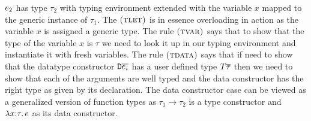 \documentclass[format=sigplan,manuscript,review,screen,nonacm,margin=1in]{acmart}
\begin{document}
$e_2$ has type $\tau_2$ with typing environment extended with the variable $x$ mapped
to the generic instance of $\tau_1$. The $\textsc{(tlet)}$ is in essence overloading in action
as the variable $x$ is assigned a generic type. The rule $\textsc{(tvar)}$ says that to show
that the type of the variable $x$ is $\tau$ we need to look it up in our typing environment
and instantiate it with fresh variables. The rule $\textsc{(tdata)}$ says that if need to show
that the datatype constructor $\texttt{D}\overline{e_i}$ has a user defined type $T\overline{\tau}$
then we need to show that each of the arguments are well typed
and the data constructor has the right type as given by its declaration.
The data constructor case can be viewed as a generalized version of function types as $\tau_1\to\tau_2$ is
a type constructor and $\lambda x{:}\tau.\, e$ as its data constructor.

\newcommand\TAbs{
  \ib{\irule[\trule{t-abs}]
    {\QTyping \Preds {\TEnv, x\co\tau_1} {\Tm} {\tau}};
    {\QTyping \Preds \TEnv {\Lam x {\tau_1} \Tm} {\tau_1 \to \tau}}}
}
 
\newcommand\TApp{
  \ib{\irule[\trule{t-app}]
    {\QTyping \Preds \TEnv {\Tm_1} {\tau_2 \to \tau}}
    {\QTyping \Preds \TEnv {\Tm_2} {\tau_2}};
    {\QTyping \Preds \TEnv {\Tm_1\App\Tm_2} {\tau}}}
}

\newcommand\TLet{\ib{\irule[\trule{t-let}]
  {\QTyping \Preds {\TEnv} {\Tm_1} \tau_1}
  {\sigma = \Gen \TEnv {\Preds\then\tau_1}}
  {\QTyping {\Preds_1} {\TEnv, x\co\sigma} {\Tm_2} \tau_2};
  {\QTyping {\Preds_1} \TEnv {\Let x {\Tm_1} {\Tm_2}} \tau_2}}
}

\newcommand\TVar{
  \ib{\irule[\trule{t-var}]
    {x\co\sigma \in \TEnv}
    {P\then\tau = \Ins{\sigma}};
    {\QTyping \Preds \TEnv x \tau}}
}

\newcommand\TDataIntro{
  \ib{\irule[\trule{\I D}]
    {\many{\QTyping \Preds \TEnv {\Tm_i} {\tau_i}}}
    {D\co{\many{\tau_i}} \to T\many\tau \in \TEnv};
    {\QTyping \Preds \TEnv {D \many{\Tm_i}} {T\many{\tau}}}}}
\end{document}

